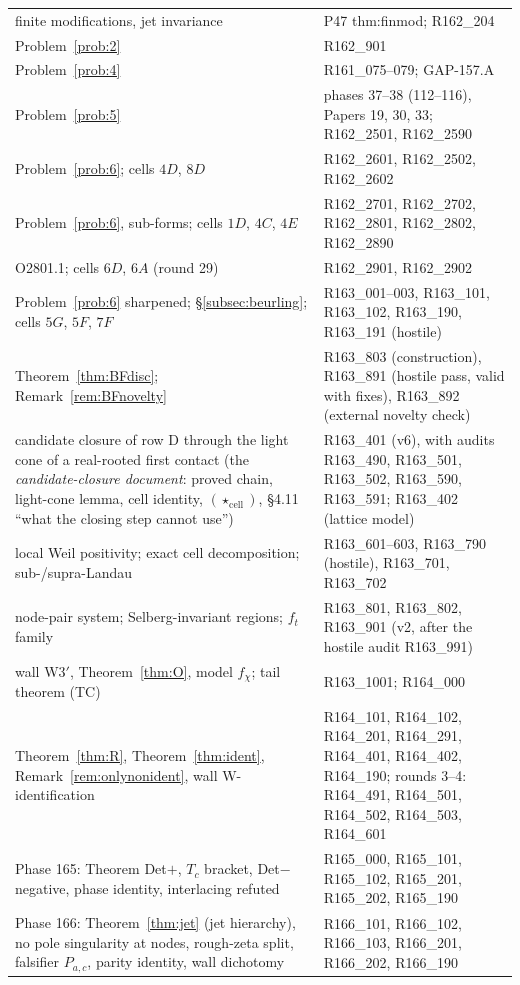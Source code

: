 \documentclass[11pt]{amsart}
\theoremstyle{definition}
\theoremstyle{remark}
\begin{document}
\begin{center}
\begin{tabularx}{\textwidth}{@{}p{5.2cm}Y@{}}
finite modifications, jet invariance & P47 thm:finmod; R162\_204 \\
Problem~\ref{prob:2} & R162\_901 \\
Problem~\ref{prob:4} & R161\_075--079; GAP-157.A \\
Problem~\ref{prob:5} & phases 37--38 (112--116), Papers 19, 30, 33; R162\_2501, R162\_2590 \\
Problem~\ref{prob:6}; cells $4D$, $8D$ & R162\_2601, R162\_2502, R162\_2602 \\
Problem~\ref{prob:6}, sub-forms; cells $1D$, $4C$, $4E$ & R162\_2701, R162\_2702, R162\_2801, R162\_2802, R162\_2890 \\
O2801.1; cells $6D$, $6A$ (round 29) & R162\_2901, R162\_2902 \\
Problem~\ref{prob:6} sharpened; \S\ref{subsec:beurling}; cells $5G$, $5F$, $7F$ & R163\_001--003, R163\_101, R163\_102, R163\_190, R163\_191 (hostile) \\
Theorem~\ref{thm:BFdisc}; Remark~\ref{rem:BFnovelty} & R163\_803 (construction), R163\_891 (hostile pass, valid with fixes), R163\_892 (external novelty check) \\
candidate closure of row D through the light cone of a real-rooted first contact (the \emph{candidate-closure document}: proved chain, light-cone lemma, cell identity, $(\star_{\mathrm{cell}})$, \S4.11 ``what the closing step cannot use'') & R163\_401 (v6), with audits R163\_490, R163\_501, R163\_502, R163\_590, R163\_591; R163\_402 (lattice model) \\
local Weil positivity; exact cell decomposition; sub-/supra-Landau & R163\_601--603, R163\_790 (hostile), R163\_701, R163\_702 \\
node-pair system; Selberg-invariant regions; $f_t$ family & R163\_801, R163\_802, R163\_901 (v2, after the hostile audit R163\_991) \\
wall W3$'$, Theorem~\ref{thm:O}, model $f_\chi$; tail theorem (TC) & R163\_1001; R164\_000 \\
Theorem~\ref{thm:R}, Theorem~\ref{thm:ident}, Remark~\ref{rem:onlynonident}, wall W-identification & R164\_101, R164\_102, R164\_201, R164\_291, R164\_401, R164\_402, R164\_190; rounds 3--4: R164\_491, R164\_501, R164\_502, R164\_503, R164\_601 \\
Phase 165: Theorem Det$+$, $T_c$ bracket, Det$-$ negative, phase identity, interlacing refuted & R165\_000, R165\_101, R165\_102, R165\_201, R165\_202, R165\_190 \\
Phase 166: Theorem~\ref{thm:jet} (jet hierarchy), no pole singularity at nodes, rough-zeta split, falsifier $P_{a,c}$, parity identity, wall dichotomy & R166\_101, R166\_102, R166\_103, R166\_201, R166\_202, R166\_190 \\
\bottomrule
\end{tabularx}
\end{center}
\end{document}
